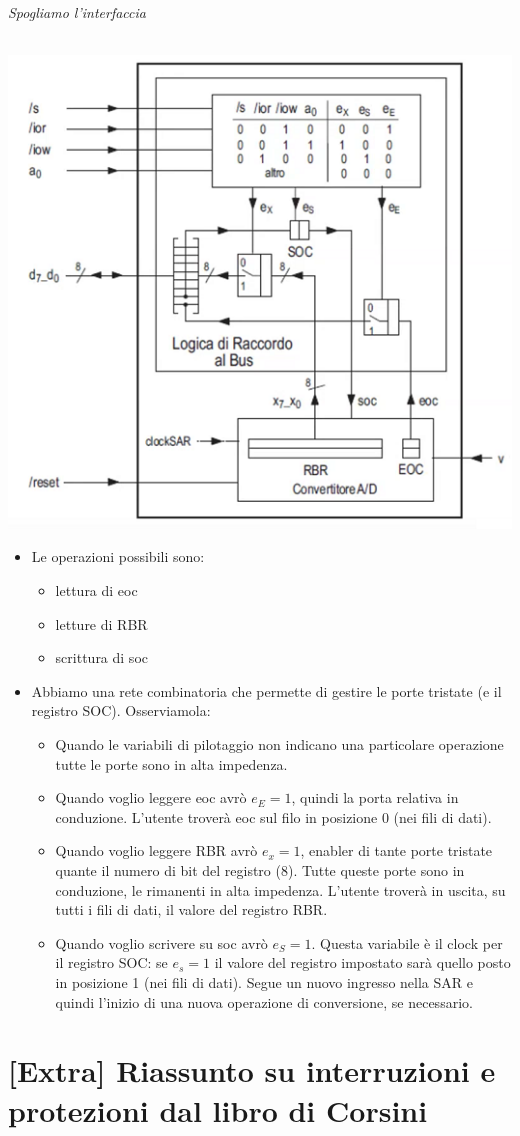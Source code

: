 \documentclass[11pt]{report}
\begin{document}
\paragraph{Spogliamo l'interfaccia}
\begin{center}
\includegraphics{img/238.PNG}
\end{center}
\begin{itemize}
\item Le operazioni possibili sono:
\begin{itemize}
\item lettura di eoc
\item letture di RBR
\item scrittura di soc
\end{itemize}
\item Abbiamo una rete combinatoria che permette di gestire le porte tristate (e il registro SOC). Osserviamola:
\begin{itemize}
\item Quando le variabili di pilotaggio non indicano una particolare operazione tutte le porte sono in alta impedenza.
\item Quando voglio leggere eoc avrò $e_E=1$, quindi la porta relativa in conduzione. L'utente troverà eoc sul filo in posizione 0 (nei fili di dati).
\item Quando voglio leggere RBR avrò $e_x=1$, enabler di tante porte tristate quante il numero di bit del registro (8). Tutte queste porte sono in conduzione, le rimanenti in alta impedenza. L'utente troverà in uscita, su tutti i fili di dati, il valore del registro RBR.
\item Quando voglio scrivere su soc avrò $e_S=1$. Questa variabile è il clock per il registro SOC: se $e_s=1$ il valore del registro impostato sarà quello posto in posizione 1 (nei fili di dati). Segue un nuovo ingresso nella SAR e quindi l'inizio di una nuova operazione di conversione, se necessario.
\end{itemize}
\end{itemize}
\appendix
\part{[Extra] Riassunto su interruzioni e protezioni dal libro di Corsini}

\end{document}
